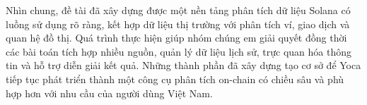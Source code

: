 Nhìn chung, đề tài đã xây dựng được một nền tảng phân tích dữ liệu Solana có luồng sử dụng rõ ràng, kết hợp dữ liệu thị trường với phân tích ví, giao dịch và quan hệ đồ thị. Quá trình thực hiện giúp nhóm chúng em giải quyết đồng thời các bài toán tích hợp nhiều nguồn, quản lý dữ liệu lịch sử, trực quan hóa thông tin và hỗ trợ diễn giải kết quả. Những thành phần đã xây dựng tạo cơ sở để Yoca tiếp tục phát triển thành một công cụ phân tích on-chain có chiều sâu và phù hợp hơn với nhu cầu của người dùng Việt Nam.
